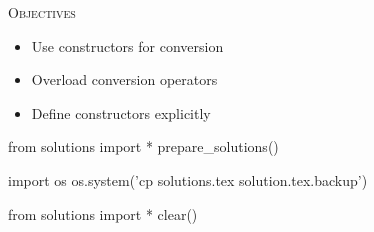 
\textsc{Objectives}
\begin{itemize}
\item Use constructors for conversion
\item Overload conversion operators
\item Define constructors explicitly
\end{itemize}






\begin{python0}
from solutions import *
prepare_solutions()
\end{python0}
\begin{python}
import os
os.system('cp solutions.tex solution.tex.backup')  
\end{python}

\begin{python0}
from solutions import *
clear()
\end{python0}
